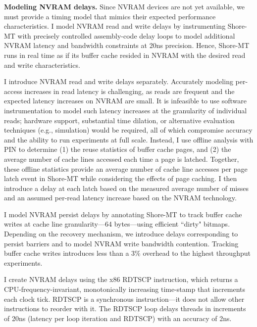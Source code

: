 \textbf{Modeling NVRAM delays.}
Since NVRAM devices are not yet available, we must provide a timing model that mimics their expected performance characteristics.
I model NVRAM read and write delays by instrumenting Shore-MT with precisely controlled assembly-code delay loops to model additional NVRAM latency and bandwidth constraints at 20ns precision.
Hence, Shore-MT runs in real time as if its buffer cache resided in NVRAM with the desired read and write characteristics.

I introduce NVRAM read and write delays separately.
Accurately modeling per-access increases in read latency is challenging, as reads are frequent and the expected latency increases on NVRAM are small.
It is infeasible to use software instrumentation to model such latency increases at the granularity of individual reads; hardware support, substantial time dilation, or alternative evaluation techniques (e.g., simulation) would be required, all of which compromise accuracy and the ability to run experiments at full scale.
Instead, I use offline analysis with PIN \cite{LukCohn05} to determine (1) the reuse statistics of buffer cache pages, and (2) the average number of cache lines accessed each time a page is latched.
Together, these offline statistics provide an average number of cache line accesses per page latch event in Shore-MT while considering the effects of page caching.
I then introduce a delay at each latch based on the measured average number of misses and an assumed per-read latency increase based on the NVRAM technology.

I model NVRAM persist delays by annotating Shore-MT to track buffer cache writes at cache line granularity---64 bytes---using efficient ``dirty" bitmaps.
Depending on the recovery mechanism, we introduce delays corresponding to persist barriers and to model NVRAM write bandwidth contention.
Tracking buffer cache writes introduces less than a 3\% overhead to the highest throughput experiments.

I create NVRAM delays using the x86 RDTSCP instruction, which returns a CPU-frequency-invariant, monotonically increasing time-stamp that increments each clock tick.
RDTSCP is a synchronous instruction---it does not allow other instructions to reorder with it.
The RDTSCP loop delays threads in increments of 20ns (latency per loop iteration and RDTSCP) with an accuracy of 2ns.

